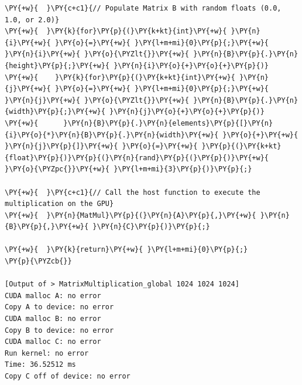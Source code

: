 \begin{Verbatim}[label=\makebox{\url{https://github.com/lucabaldini/cmepda/tree/master/slides/latex/snippets/MatrixMultiplication_global.cu}},commandchars=\\\{\}]
\PY{+w}{  }\PY{c+c1}{// Populate Matrix B with random floats (0.0, 1.0, or 2.0)}
\PY{+w}{  }\PY{k}{for}\PY{p}{(}\PY{k+kt}{int}\PY{+w}{ }\PY{n}{i}\PY{+w}{ }\PY{o}{=}\PY{+w}{ }\PY{l+m+mi}{0}\PY{p}{;}\PY{+w}{ }\PY{n}{i}\PY{+w}{ }\PY{o}{\PYZlt{}}\PY{+w}{ }\PY{n}{B}\PY{p}{.}\PY{n}{height}\PY{p}{;}\PY{+w}{ }\PY{n}{i}\PY{o}{+}\PY{o}{+}\PY{p}{)}
\PY{+w}{    }\PY{k}{for}\PY{p}{(}\PY{k+kt}{int}\PY{+w}{ }\PY{n}{j}\PY{+w}{ }\PY{o}{=}\PY{+w}{ }\PY{l+m+mi}{0}\PY{p}{;}\PY{+w}{ }\PY{n}{j}\PY{+w}{ }\PY{o}{\PYZlt{}}\PY{+w}{ }\PY{n}{B}\PY{p}{.}\PY{n}{width}\PY{p}{;}\PY{+w}{ }\PY{n}{j}\PY{o}{+}\PY{o}{+}\PY{p}{)}
\PY{+w}{      }\PY{n}{B}\PY{p}{.}\PY{n}{elements}\PY{p}{[}\PY{n}{i}\PY{o}{*}\PY{n}{B}\PY{p}{.}\PY{n}{width}\PY{+w}{ }\PY{o}{+}\PY{+w}{ }\PY{n}{j}\PY{p}{]}\PY{+w}{ }\PY{o}{=}\PY{+w}{ }\PY{p}{(}\PY{k+kt}{float}\PY{p}{)}\PY{p}{(}\PY{n}{rand}\PY{p}{(}\PY{p}{)}\PY{+w}{ }\PY{o}{\PYZpc{}}\PY{+w}{ }\PY{l+m+mi}{3}\PY{p}{)}\PY{p}{;}

\PY{+w}{  }\PY{c+c1}{// Call the host function to execute the multiplication on the GPU}
\PY{+w}{  }\PY{n}{MatMul}\PY{p}{(}\PY{n}{A}\PY{p}{,}\PY{+w}{ }\PY{n}{B}\PY{p}{,}\PY{+w}{ }\PY{n}{C}\PY{p}{)}\PY{p}{;}

\PY{+w}{  }\PY{k}{return}\PY{+w}{ }\PY{l+m+mi}{0}\PY{p}{;}
\PY{p}{\PYZcb{}}

[Output of > MatrixMultiplication_global 1024 1024 1024]
CUDA malloc A: no error
Copy A to device: no error
CUDA malloc B: no error
Copy B to device: no error
CUDA malloc C: no error
Run kernel: no error
Time: 36.52512 ms
Copy C off of device: no error
\end{Verbatim}